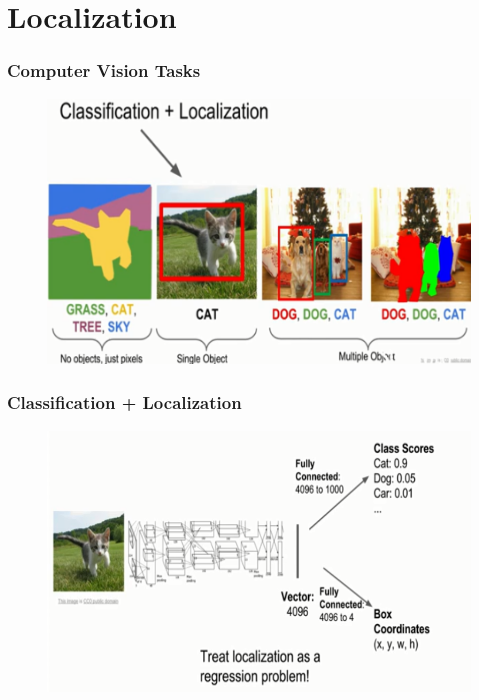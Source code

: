 \documentclass{beamer}
\begin{document}
\section{Localization}
\begin{frame}
	\frametitle{Computer Vision Tasks}
	
	\begin{figure}
		\includegraphics[width=\linewidth]{Pics/classloc.PNG}
		
	\end{figure}
	
\end{frame}
\begin{frame}
	\frametitle{Classification + Localization}
	\begin{figure}
		\includegraphics[width=\linewidth]{Pics/loc2.PNG}
	\end{figure}
	
\end{frame}
\end{document}

